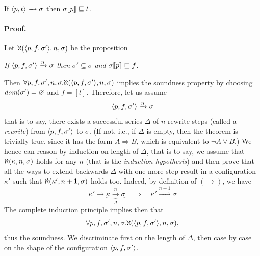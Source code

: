 
\begin{theorem}[Soundness]\hfill
\label{f0:soundness}
\begin{center}
If \(\smat{t}{p} \xrightarrow{+} \sigma\)
then \(\subst{p}{\sigma} \sqsubseteq t\).
\end{center}
\end{theorem}

\paragraph{Proof.}

Let \(\ind{P}(\match{f}{p}{\sigma'}, n, \sigma)\) be the proposition
\begin{center}
\emph{If} \(\match{f}{p}{\sigma'} \xrightarrow{n} \sigma\)
\emph{then} \(\sigma' \subseteq \sigma\)
\emph{and} \(\subst{p}{\sigma} \sqsubseteq f\).
\end{center}
Then \(\forall p, f, \sigma', n, \sigma.\ind{P}(\match{f}{p}{\sigma'},
n, \sigma)\) implies the soundness property by choosing
\(\dom{\sigma'} = \varnothing\) and \(f = [t]\). Therefore, let us
assume
\begin{equation}
\match{f}{p}{\sigma'} \xrightarrow{n} \sigma \label{f0:sound:n}
\end{equation}
that is to say, there exists a successful series \(\Delta\) of \(n\)
rewrite steps (called a \emph{rewrite}) from \(\match{f}{p}{\sigma'}\)
to \(\sigma\). (If not, i.e., if \(\Delta\) is empty, then the theorem
is trivially true, since it has the form \(A \Rightarrow B\), which is
equivalent to \(\neg{A} \vee B\).) We hence can reason by induction on
length of \(\Delta\), that is to say, we assume that \(\ind{P}(\kappa,
n, \sigma)\) holds for any \(n\) (that is the \emph{induction
  hypothesis}) and then prove that all the ways to extend backwards
\(\Delta\) with one more step result in a configuration \(\kappa'\)
such that \(\ind{P}(\kappa', n+1, \sigma)\) holds too. Indeed, by
definition of \((\rightarrow)\), we have
\[
\kappa' \rightarrow \underbrace{\kappa \xrightarrow{n} \sigma}_{\Delta}
\quad \Longrightarrow \quad
\kappa' \xrightarrow{n+1} \sigma
\]
The complete induction principle implies then that \[\forall p,
f, \sigma', n, \sigma.\ind{P}(\match{f}{p}{\sigma'}, n, \sigma),\]
thus the soundness. We discriminate first on the length of \(\Delta\),
then case by case on the shape of the configuration
\(\match{f}{p}{\sigma'}\).
